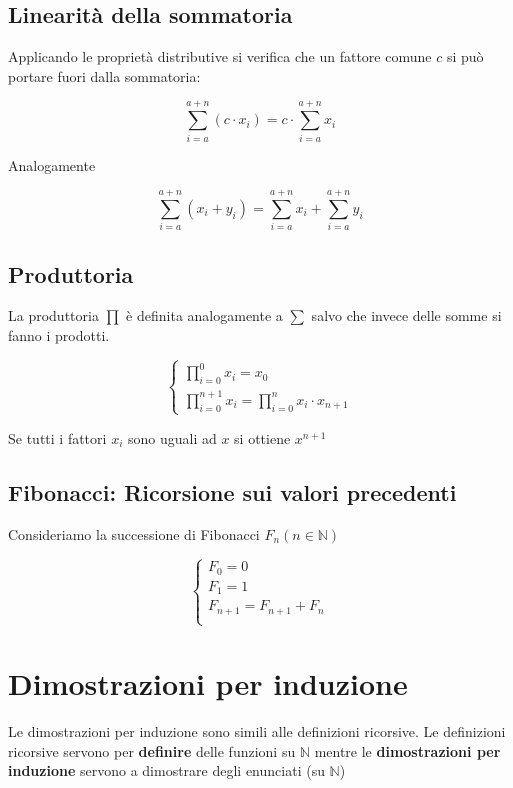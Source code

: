 \subsection{Linearità della sommatoria}

Applicando le proprietà distributive si verifica che un fattore comune $c$ si può portare fuori dalla sommatoria:

$$ \displaystyle \sum_{i=a}^{a+n} {(c \cdot x_i)} = c \cdot \sum_{i=a}^{a+n} {x_i}  $$

Analogamente 

$$ \displaystyle \sum_{i=a}^{a+n} {(x_i + y_i)} = \sum_{i=a}^{a+n} {x_i} + \sum_{i=a}^{a+n} {y_i} $$


\subsection{Produttoria}

La produttoria $\prod$ è definita analogamente a $\sum$ salvo che invece delle somme si fanno i prodotti.

$$\begin{cases}
\displaystyle \prod_{i=0}^0 {x_i} = x_0 \\
\displaystyle \prod_{i=0}^{n+1} {x_i} = \prod_{i=0}^{n}{x_i}  \cdot x_{n+1} 
\end{cases}$$

Se tutti i fattori $x_i$ sono uguali ad $x$ si ottiene $x^{n+1}$



\subsection{Fibonacci: Ricorsione sui valori precedenti}

Consideriamo la successione di Fibonacci $F_n (n \in \mathbb{N})$

$$\begin{cases}
F_0 = 0 \\
F_1 = 1 \\
F_{n+1} = F_{n+1} + F_n \\
\end{cases} $$


\section{Dimostrazioni per induzione}

Le dimostrazioni per induzione sono simili alle definizioni ricorsive. Le definizioni ricorsive servono per { \bf definire} delle funzioni su $\mathbb{N}$ mentre le {\bf dimostrazioni per induzione} servono a dimostrare degli enunciati (su $\mathbb{N}$)

